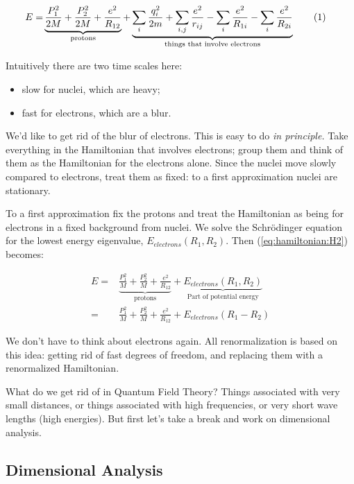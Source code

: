 \documentclass[]{article}
\newcommand\numberthis{\addtocounter{equation}{1}\tag{\theequation}}
\begin{document}
\begin{align*}
	E=& \underbrace{\frac{P_1^2}{2M} + \frac{P_2^2}{2M} + \frac{e^2}{R_{12}}}_\text{protons} + \underbrace{\sum_i \frac{q_i^2}{2m} + \sum_{i,j}\frac{e^2}{r_{ij}}- \sum_i \frac{e^2}{R_{1i}} - \sum_i \frac{e^2}{R_{2i}}}_\text{things that involve electrons} \numberthis \label{eq:hamiltonian:H2}
\end{align*}

Intuitively there are two time scales here:
\begin{itemize}
	\item slow for nuclei, which are heavy;
	\item fast for electrons, which are a blur.
\end{itemize}

We'd like to get rid of the blur of electrons. This is easy to do \emph{in principle.} Take everything in the Hamiltonian that involves electrons; group them and think of them as the Hamiltonian for the electrons alone. Since the nuclei move slowly compared to electrons, treat them as fixed: to a first approximation nuclei are stationary.

To a first approximation fix the protons and treat the Hamiltonian as being for electrons in a fixed background from nuclei. We solve the Schr\"odinger equation for the lowest energy eigenvalue, $E_{electrons}(R_1,R_2)$. Then (\ref{eq:hamiltonian:H2}) becomes:


\begin{align*}
E=& \underbrace{\frac{P_1^2}{M} + \frac{P_2^2}{M} + \frac{e^2}{R_{12}}}_\text{protons} +\underbrace{ E_{electrons}(R_1,R_2)}_\text{Part of potential energy}\\
=& \frac{P_1^2}{M} + \frac{P_2^2}{M} + \frac{e^2}{R_{12}}+ E_{electrons}(R_1-R_2)
\end{align*}

We don't have to think about electrons again. All renormalization is based on this idea: getting rid of fast degrees of freedom, and replacing them with a renormalized Hamiltonian. 

What do we get rid of in Quantum Field Theory? Things associated with very small distances, or things associated with high frequencies, or very short wave lengths (high energies). But first let's take a break and work on dimensional analysis.

\subsection{Dimensional Analysis}
\end{document}
